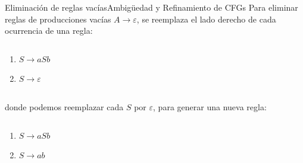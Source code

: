\documentclass[spanish]{beamer}
\begin{document}
\begin{frame}{Eliminación de reglas vacías}{Ambigüedad y Refinamiento de CFGs}
    Para eliminar reglas de producciones vacías $A \to \varepsilon$, se reemplaza el lado derecho de cada ocurrencia de una regla: \pause

    \bigskip

    \begin{columns}
        \begin{column}{0.5\textwidth}
            \begin{enumerate}
                \item $S \to aSb$
                \item $S \to \varepsilon$
            \end{enumerate} \pause
        \end{column}
        \begin{column}{0.5\textwidth}
        \end{column}
    \end{columns}

    \bigskip

    donde podemos reemplazar cada $S$ por $\varepsilon$, para generar una nueva regla: \pause

    \bigskip

    \begin{columns}
        \begin{column}{0.5\textwidth}
            \begin{enumerate}
                \item $S \to aSb$
                \item $S \to ab$
            \end{enumerate} \pause
        \end{column}
        \begin{column}{0.5\textwidth}
        \end{column}
    \end{columns}

    \bigskip




\end{frame}
\end{document}
